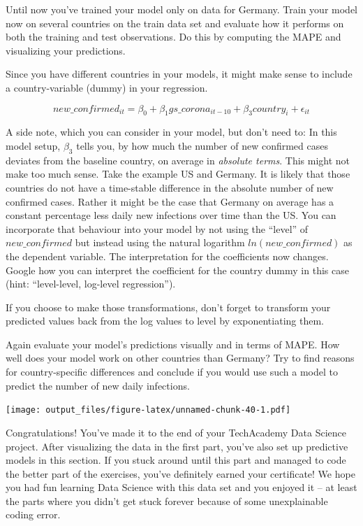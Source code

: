 \documentclass[
  11pt,
]{article}
\begin{document}
Until now you've trained your model only on data for Germany. Train your model now on several countries on the train data set and evaluate how it performs on both the training and test observations. Do this by computing the MAPE and visualizing your predictions.

Since you have different countries in your models, it might make sense to include a country-variable (dummy) in your regression.

\[new\_confirmed_{it} = \beta_0 + \beta_1 gs\_corona_{it-10} + \beta_3 country_i +\epsilon_{it} \]

A side note, which you can consider in your model, but don't need to: In this model setup, \(\beta_3\) tells you, by how much the number of new confirmed cases deviates from the baseline country, on average in \emph{absolute terms}. This might not make too much sense. Take the example US and Germany. It is likely that those countries do not have a time-stable difference in the absolute number of new confirmed cases. Rather it might be the case that Germany on average has a constant percentage less daily new infections over time than the US. You can incorporate that behaviour into your model by not using the ``level'' of \(new\_confirmed\) but instead using the natural logarithm \(ln(new\_confirmed)\) as the dependent variable. The interpretation for the coefficients now changes. Google how you can interpret the coefficient for the country dummy in this case (hint: ``level-level, log-level regression'').

If you choose to make those transformations, don't forget to transform your predicted values back from the log values to level by exponentiating them.

Again evaluate your model's predictions visually and in terms of MAPE. How well does your model work on other countries than Germany? Try to find reasons for country-specific differences and conclude if you would use such a model to predict the number of new daily infections.

\texttt{[image: output\_files/figure-latex/unnamed-chunk-40-1.pdf]}

Congratulations! You've made it to the end of your TechAcademy Data Science project.
After visualizing the data in the first part, you've also set up predictive models in this section.
If you stuck around until this part and managed to code the better part of the exercises, you've definitely earned your certificate!
We hope you had fun learning Data Science with this data set and you enjoyed it -- at least the parts where you didn't get stuck forever because of some unexplainable coding error.
\end{document}
